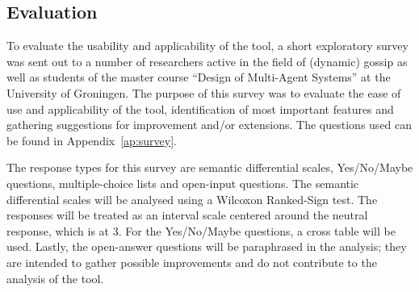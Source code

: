 \subsection{Evaluation}

To evaluate the usability and applicability of the tool,
a short exploratory survey was sent out to a number of researchers active in the field of (dynamic) gossip as well as students of the master course ``Design of Multi-Agent Systems'' at the University of Groningen.
The purpose of this survey was to evaluate the ease of use and applicability of the tool,
identification of most important features and gathering suggestions for improvement and/or extensions.
The questions used can be found in Appendix~\ref{ap:survey}.

The response types for this survey are semantic differential scales, Yes/No/Maybe questions, multiple-choice lists and open-input questions. The semantic differential scales will be analysed using a Wilcoxon Ranked-Sign test. 
The responses will be treated as an interval scale centered around the neutral response, which is at 3.
For the Yes/No/Maybe questions, a cross table will be used.
Lastly, the open-answer questions will be paraphrased in the analysis; 
they are intended to gather possible improvements and do not contribute to the analysis of the tool.